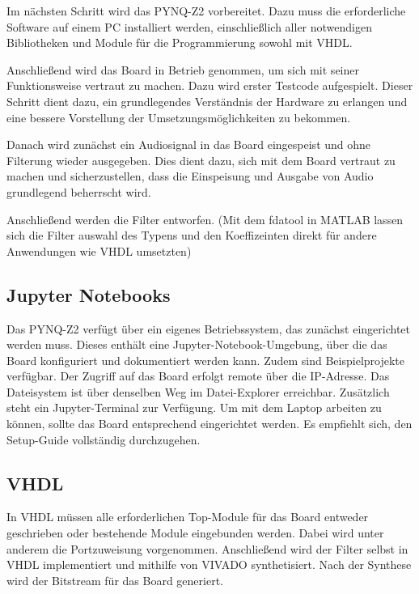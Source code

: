 \documentclass[
  ngerman,
  letterpaper,
  DIV=11]{scrartcl}
\begin{document}
Im nächsten Schritt wird das PYNQ-Z2 vorbereitet. Dazu muss die
erforderliche Software auf einem PC installiert werden, einschließlich
aller notwendigen Bibliotheken und Module für die Programmierung sowohl
mit VHDL.

Anschließend wird das Board in Betrieb genommen, um sich mit seiner
Funktionsweise vertraut zu machen. Dazu wird erster Testcode
aufgespielt. Dieser Schritt dient dazu, ein grundlegendes Verständnis
der Hardware zu erlangen und eine bessere Vorstellung der
Umsetzungsmöglichkeiten zu bekommen.

Danach wird zunächst ein Audiosignal in das Board eingespeist und ohne
Filterung wieder ausgegeben. Dies dient dazu, sich mit dem Board
vertraut zu machen und sicherzustellen, dass die Einspeisung und Ausgabe
von Audio grundlegend beherrscht wird.

Anschließend werden die Filter entworfen. (Mit dem fdatool in MATLAB
lassen sich die Filter auswahl des Typens und den Koeffizeinten direkt
für andere Anwendungen wie VHDL umsetzten)

\subsection{Jupyter Notebooks}\label{jupyter-notebooks}

Das PYNQ-Z2 verfügt über ein eigenes Betriebssystem, das zunächst
eingerichtet werden muss. Dieses enthält eine Jupyter-Notebook-Umgebung,
über die das Board konfiguriert und dokumentiert werden kann. Zudem sind
Beispielprojekte verfügbar. Der Zugriff auf das Board erfolgt remote
über die IP-Adresse. Das Dateisystem ist über denselben Weg im
Datei-Explorer erreichbar. Zusätzlich steht ein Jupyter-Terminal zur
Verfügung. Um mit dem Laptop arbeiten zu können, sollte das Board
entsprechend eingerichtet werden. Es empfiehlt sich, den Setup-Guide
vollständig durchzugehen.

\subsection{VHDL}\label{vhdl}

In VHDL müssen alle erforderlichen Top-Module für das Board entweder
geschrieben oder bestehende Module eingebunden werden. Dabei wird unter
anderem die Portzuweisung vorgenommen. Anschließend wird der Filter
selbst in VHDL implementiert und mithilfe von VIVADO synthetisiert. Nach
der Synthese wird der Bitstream für das Board generiert.
\end{document}
